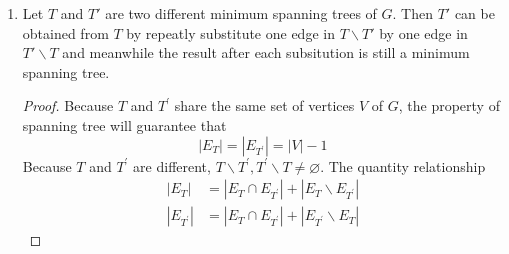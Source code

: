 \documentclass[12pt,a4paper]{article}
\newtheorem{proposition}[theorem]{Proposition}
\theoremstyle{definition}
\begin{document}
\begin{enumerate}
\begin{enumerate}
            \hfil \qed \vspace{\parskip}
            
            \begin{proposition}\label{prop:ns}
                There is no minimum spanning tree that includes $e$ if such weight on $e$ is unique.
            \end{proposition}
            \textbf{Proof of Proposition \ref{prop:ns}.} 
                Proof by contradiction. Suppose the minimum spanning tree $T$ contains $e$, then by the same deduction in Proposition \ref{prop:ni}, the weight of $e^\prime: v_n\leftrightarrow v_0$ is strictly smaller than that of $e$.
                \begin{equation*}
                    |e^\prime|< |e|
                \end{equation*}
                Thus, the new spanning tree $T^\prime=(V,E-\{e\}+\{e^\prime\})$ will get a smaller overall weight of edges.
                \begin{equation*}
                    \sum_{e_i\in E_T-\{e\}}|e_i| + |e^\prime| < |e|+ \sum_{e_i\in E_T-\{e\}}|e_i|
                \end{equation*}
                which conflicts the minimality of $T$. Therefore, the minimum spanning tree does not include $e$ in this scenario.
            \hfil \qed \vspace{\parskip}
		\item Let $T$ and $T'$ are two different minimum spanning trees of $G$. Then $T'$ can be obtained from $T$ by repeatly substitute one edge in $T\backslash T'$ by one edge in $T'\backslash T$ and meanwhile the result after each subsitution is still a minimum spanning tree.
		\begin{proof}
            Because $T$ and $T^\prime$ share the same set of vertices $V$ of $G$, the property of spanning tree will guarantee that 
            \begin{equation}\label{eq:ne}
                |E_T| = |E_{T^\prime}| = |V|-1
            \end{equation}
            Because $T$ and $T^\prime$ are different, $T\backslash T^\prime,T^\prime\backslash T\neq \varnothing$. The quantity relationship
            \begin{align*}
                |E_T| &= |E_T\cap E_{T^\prime}| + |E_T\backslash E_{T^\prime}|\\
                |E_{T^\prime}| &= |E_T\cap E_{T^\prime}| + |E_{T^\prime}\backslash E_T|

\end{align*}
\end{proof}
\end{enumerate}
\end{enumerate}
\end{document}
